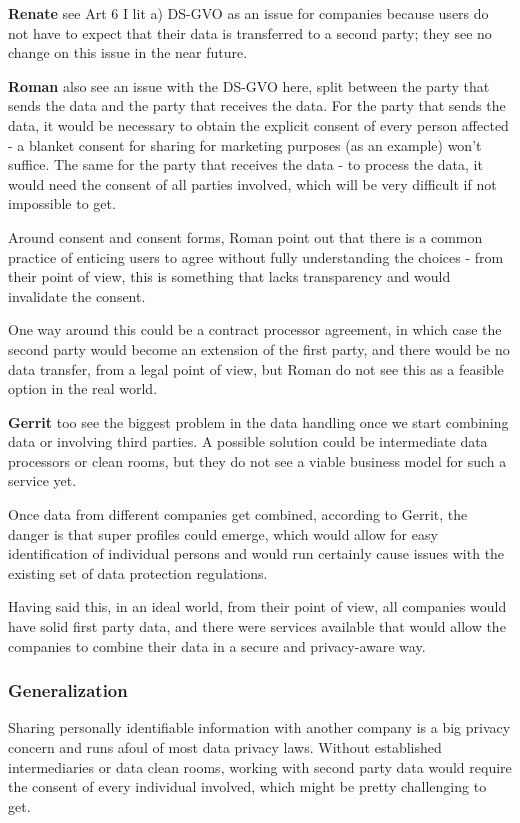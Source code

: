 \textbf{Renate} see Art 6 I lit a) DS-GVO as an issue for companies because users do not have to expect that their data is transferred to a second party; they see no change on this issue in the near future.

\textbf{Roman} also see an issue with the DS-GVO here, split between the party that sends the data and the party that receives the data. For the party that sends the data, it would be necessary to obtain the explicit consent of every person affected - a blanket consent for sharing for marketing purposes (as an example) won't suffice. The same for the party that receives the data - to process the data, it would need the consent of all parties involved, which will be very difficult if not impossible to get.

Around consent and consent forms, Roman point out that there is a common practice of enticing users to agree without fully understanding the choices - from their point of view, this is something that lacks transparency and would invalidate the consent.

One way around this could be a contract processor agreement, in which case the second party would become an extension of the first party, and there would be no data transfer, from a legal point of view, but Roman do not see this as a feasible option in the real world.

\textbf{Gerrit} too see the biggest problem in the data handling once we start combining data or involving third parties. A possible solution could be intermediate data processors or clean rooms, but they do not see a viable business model for such a service yet.

Once data from different companies get combined, according to Gerrit, the danger is that super profiles could emerge, which would allow for easy identification of individual persons and would run certainly cause issues with the existing set of data protection regulations.

Having said this, in an ideal world, from their point of view, all companies would have solid first party data, and there were services available that would allow the companies to combine their data in a secure and privacy-aware way. 

\subsubsection{Generalization}

Sharing personally identifiable information with another company is a big privacy concern and runs afoul of most data privacy laws. Without established intermediaries or data clean rooms, working with second party data would require the consent of every individual involved, which might be pretty challenging to get.

